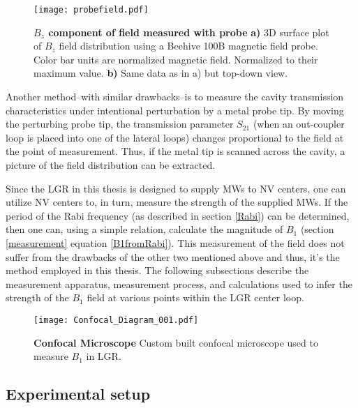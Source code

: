 \begin{figure}[t!]
\centering
\texttt{[image: probefield.pdf]}  
\caption{\textbf{$B_z$ component of field measured with probe} \textbf{a)} 3D surface plot of $B_z$ field distribution using a Beehive 100B magnetic field probe. Color bar units are normalized magnetic field. Normalized to their maximum value. \textbf{b)} Same data as in a) but top-down view. }
\label{LGR_probe}
\end{figure}

Another method--with similar drawbacks--is to measure the cavity transmission characteristics under intentional perturbation by a metal probe tip. By moving the perturbing probe tip, the transmission parameter $S_{21}$ (when an out-coupler loop is placed into one of the lateral loops) changes proportional to the field at the point of measurement. Thus, if the metal tip is scanned across the cavity, a picture of the field distribution can be extracted.  

Since the LGR in this thesis is designed to supply MWs to NV centers, one can utilize NV centers to, in turn, measure the strength of the supplied MWs. If the period of the Rabi frequency (as described in section \ref{Rabi}) can be determined, then one can, using a simple relation, calculate the magnitude of $B_1$ (section \ref{measurement} equation \ref{B1fromRabi}). This measurement of the field does not suffer from the drawbacks of the other two mentioned above and thus, it's the method employed in this thesis. The following subsections describe the measurement apparatus, measurement process, and calculations used to infer the strength of the $B_1$ field at various points within the LGR center loop.

\begin{landscape}
\begin{figure}[b!]
\centering
\texttt{[image: Confocal\_Diagram\_001.pdf]}  
\caption{\textbf{Confocal Microscope} Custom built confocal microscope used to measure $B_1$ in LGR.}
\label{LGR_confocal_diagram}
\end{figure}
\end{landscape}

\subsection{Experimental setup} \label{setup}

